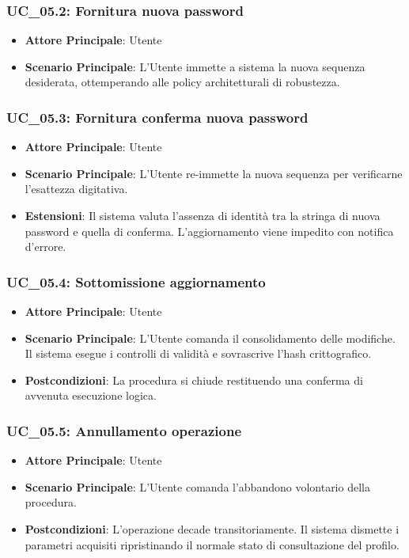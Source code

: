 \subsubsection{UC\_05.2: Fornitura nuova password}
\label{uc_05.2}
\begin{itemize}
    \item \textbf{Attore Principale}: Utente
    \item \textbf{Scenario Principale}: L'Utente immette a sistema la nuova sequenza desiderata, ottemperando alle policy architetturali di robustezza.
\end{itemize}

\subsubsection{UC\_05.3: Fornitura conferma nuova password}
\label{uc_05.3}
\begin{itemize}
    \item \textbf{Attore Principale}: Utente
    \item \textbf{Scenario Principale}: L'Utente re-immette la nuova sequenza per verificarne l'esattezza digitativa.
    \item \textbf{Estensioni}: Il sistema valuta l'assenza di identità tra la stringa di nuova password e quella di conferma. L'aggiornamento viene impedito con notifica d'errore.
\end{itemize}

\subsubsection{UC\_05.4: Sottomissione aggiornamento}
\label{uc_05.4}
\begin{itemize}
    \item \textbf{Attore Principale}: Utente
    \item \textbf{Scenario Principale}: L'Utente comanda il consolidamento delle modifiche. Il sistema esegue i controlli di validità e sovrascrive l'hash crittografico.
    \item \textbf{Postcondizioni}: La procedura si chiude restituendo una conferma di avvenuta esecuzione logica.
\end{itemize}

\subsubsection{UC\_05.5: Annullamento operazione}
\label{uc_05.5}
\begin{itemize}
    \item \textbf{Attore Principale}: Utente
    \item \textbf{Scenario Principale}: L'Utente comanda l'abbandono volontario della procedura.
    \item \textbf{Postcondizioni}: L'operazione decade transitoriamente. Il sistema dismette i parametri acquisiti ripristinando il normale stato di consultazione del profilo.
\end{itemize}

